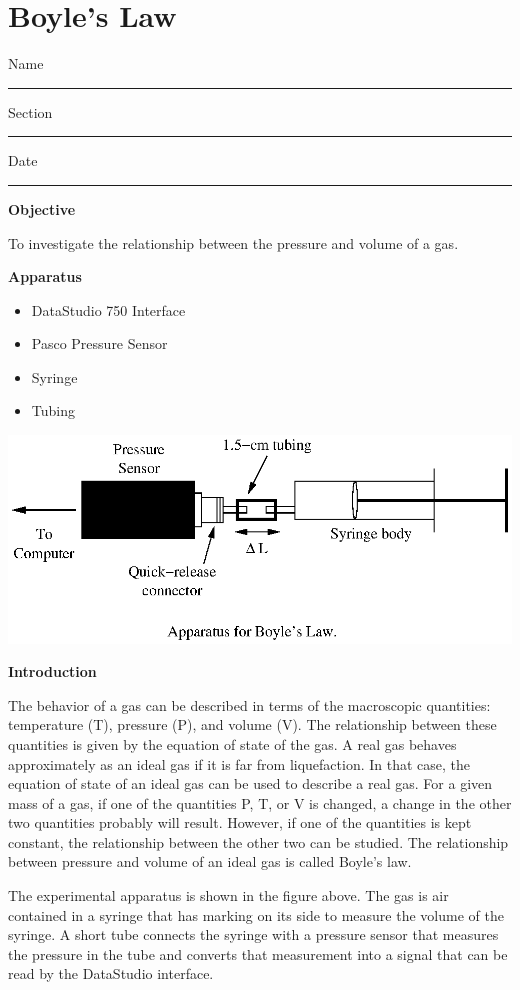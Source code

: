 
\section{Boyle's Law}

Name \rule{2.0in}{0.1pt}\hfill{}Section \rule{1.0in}{0.1pt}\hfill{}Date
\rule{1.0in}{0.1pt}

\textbf{Objective}

To investigate the relationship between the pressure and volume of
a gas.

\textbf{Apparatus}

\begin{itemize}
\item DataStudio 750 Interface
\item Pasco Pressure Sensor
\item Syringe
\item Tubing
\end{itemize}
\vspace{0.3cm}
{\par\centering \includegraphics{boyleslawfig1.eps} \par}
\vspace{0.3cm}

\textbf{Introduction}

The behavior of a gas can be described in terms of the macroscopic quantities:
temperature (T), pressure (P), and volume (V). The relationship between these
quantities is given by the equation of state of the gas. A real gas behaves
approximately as an ideal gas if it is far from liquefaction. In that case,
the equation of state of an ideal gas can be used to describe a real gas. For
a given mass of a gas, if one of the quantities P, T, or V is changed, a change
in the other two quantities probably will result. However, if one of the quantities
is kept constant, the relationship between the other two can be studied. The
relationship between pressure and volume of an ideal gas is called Boyle's law.

The experimental apparatus is shown in the figure above. The gas is air contained
in a syringe that has marking on its side to measure the volume of the syringe.
A short tube connects the syringe with a pressure sensor that measures the pressure
in the tube and converts that measurement into a signal that can be read by
the DataStudio interface.

